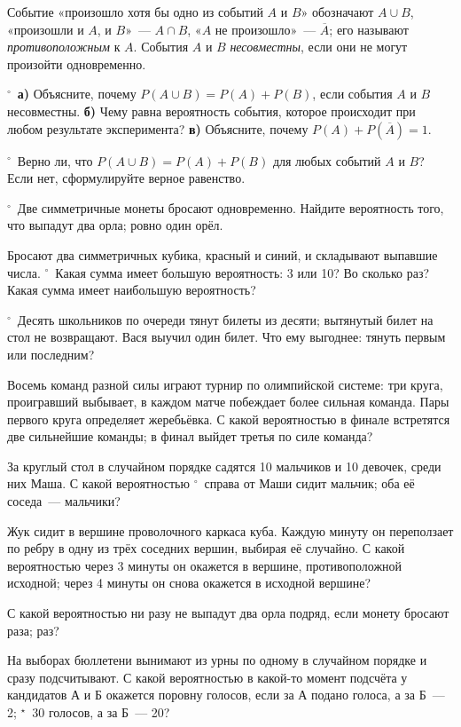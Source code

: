 Событие «произошло хотя бы одно из событий $A$ и $B$» обозначают $A\cup B$, «произошли и $A$, и $B$»~— $A\cap B$, «$A$ не произошло»~— $\overline{A}$; его называют \textit{противоположным} к $A$. События $A$ и $B$ \textit{несовместны}, если они не могут произойти одновременно.

\zp \unskip$^{\circ}$\ \textbf{а)} Объясните, почему $P(A\cup B)=P(A)+P(B)$, если события $A$ и $B$ несовместны. \textbf{б)} Чему равна вероятность события, которое происходит при любом результате эксперимента? \textbf{в)} Объясните, почему $P(A)+P(\overline{A})=1$.

\zp \unskip$^{\circ}$\ Верно ли, что $P(A\cup B)=P(A)+P(B)$ для любых событий $A$ и $B$? Если нет, сформулируйте верное равенство.

\divby

\zp \unskip$^{\circ}$\ Две симметричные монеты бросают одновременно. Найдите вероятность того, что выпадут два орла; ровно один орёл.

\z Бросают два симметричных кубика, красный и синий, и складывают выпавшие числа.
 \unskip$^{\circ}$\ Какая сумма имеет большую вероятность: 3 или 10? Во сколько раз?
 Какая сумма имеет наибольшую вероятность?

\zp \unskip$^{\circ}$\ Десять школьников по очереди тянут билеты из десяти; вытянутый билет на стол не возвращают. Вася выучил один билет. Что ему выгоднее: тянуть первым или последним?

\z Восемь команд разной силы играют турнир по олимпийской системе: три круга, проигравший выбывает, в каждом матче побеждает более сильная команда. Пары первого круга определяет жеребьёвка. С какой вероятностью  в финале встретятся две сильнейшие команды;  в финал выйдет третья по силе команда?

\z За круглый стол в случайном порядке садятся 10 мальчиков и 10 девочек, среди них Маша. С какой вероятностью  \unskip$^{\circ}$\ справа от Маши сидит мальчик;  оба её соседа~— мальчики?

\z Жук сидит в вершине проволочного каркаса куба. Каждую минуту он переползает по ребру в одну из трёх соседних вершин, выбирая её случайно. С какой вероятностью
 через 3 минуты он окажется в вершине, противоположной исходной;
 через 4 минуты он снова окажется в исходной вершине?

\z С какой вероятностью ни разу не выпадут два орла подряд, если монету бросают  раза;  раз?

\z На выборах бюллетени вынимают из урны по одному в случайном порядке и сразу подсчитывают. С какой вероятностью в какой-то момент подсчёта у кандидатов А и Б окажется поровну голосов, если за А подано  голоса, а за Б~— 2;  \unskip$^{\star}$\ 30 голосов, а за Б~— 20?

